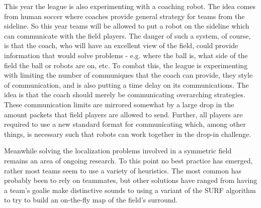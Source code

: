 \documentclass{llncs}
\begin{document}
This year the league is also experimenting with a coaching robot. The
idea comes from human soccer where coaches provide general strategy
for teams from the sideline. So this year teams will be allowed to put
a robot on the sideline which can communicate with the field players. The
danger of such a system, of course, is that the coach, who will have an
excellent view of the field, could provide information that would solve
problems - e.g. where the ball is, what side of the field the ball or robots
are on, etc. To combat this, the league is experimenting with limiting
the number of communiques that the coach can provide, they style of
communication, and is also putting a time delay on its communications.
The idea is that the coach should merely be communicating overarching
strategies.
These communication limits are mirrored somewhat by a large drop in
the amount packets that field players are allowed to send. Further, all
players are required to use a new standard format for communicating
which, among other things, is necessary such that robots can work together
in the drop-in challenge.

Meanwhile solving the localization problems involved in a symmetric
field remains an area of ongoing research. To this point no best
practice has emerged, rather most teams seem to use a variety of
heuristics. The most common has probably been to rely on teammates,
but other solutions have ranged from having a team's goalie make
distinctive sounds to using a variant of the SURF algorithm to try
to build an on-the-fly map of the field's surround.
\end{document}
